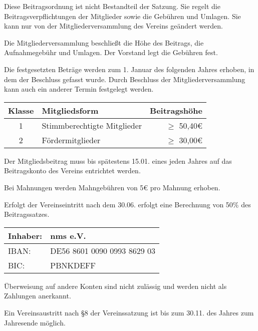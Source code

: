 \begin{beitrag}

  Diese Beitragsordnung ist nicht Bestandteil der Satzung. Sie regelt die Beitragsverpflichtungen der Mitglieder sowie die Gebühren und Umlagen. Sie kann nur von der Mitgliederversammlung des Vereins geändert werden.

  Die Mitgliederversammlung beschließt die Höhe des Beitrags, die Aufnahmegebühr und Umlagen. Der Vorstand legt die Gebühren fest.

  Die festgesetzten Beträge werden zum 1. Januar des folgenden Jahres erhoben, in dem der Beschluss gefasst wurde. Durch Beschluss der Mitgliederversammlung kann auch ein anderer Termin festgelegt werden.


  \begin{center}
    \begin{tabular}{ |c|l|r| }
      \hline
      Klasse & Mitgliedsform               & Beitragshöhe     \\
      \hline \hline
      1      & Stimmberechtigte Mitglieder & $\ge$ 50,40\euro \\
      2      & Fördermitglieder            & $\ge$ 30,00\euro \\
      \hline
    \end{tabular}
  \end{center}

  Der Mitgliedsbeitrag muss bis spätestens 15.01. eines jeden Jahres auf das Beitragskonto des Vereins entrichtet werden.

  Bei Mahnungen werden Mahngebühren von 5\euro{} pro Mahnung erhoben.

  Erfolgt der Vereinseintritt nach dem 30.06. erfolgt eine Berechnung von 50\% des Beitragssatzes.


  \begin{center}
    \begin{tabular}{ |ll| }
      \hline
      Inhaber: & nms e.V.                    \\
      \hline
      IBAN:    & DE56 8601 0090 0993 8629 03 \\
      \hline
      BIC:     & PBNKDEFF                    \\
      \hline
    \end{tabular}
  \end{center}

  Überweisung auf andere Konten sind nicht zulässig und werden nicht als Zahlungen anerkannt.

  Ein Vereinsaustritt nach \S 8 der Vereinssatzung ist bis zum 30.11. des Jahres zum Jahresende möglich.

\end{beitrag}

